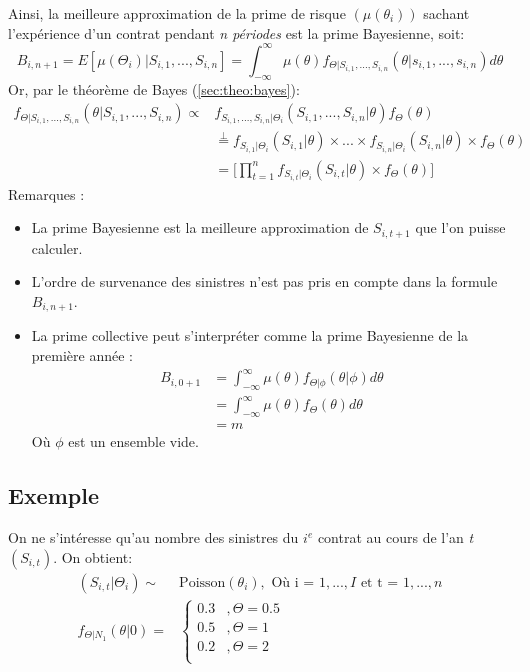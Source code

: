 \documentclass[11pt,french]{report}
\begin{document}
Ainsi, la meilleure approximation de la prime de risque $(\mu(\theta_i))$ sachant l'expérience d'un contrat pendant \emph{n périodes} est la prime Bayesienne, soit:
\begin{equation}
\label{eq:prime bayesienne}
B_{i,n+1} = E[\mu(\Theta_i)|S_{i,1}, ..., S_{i,n}] = \int_{-\infty}^{\infty} \mu(\theta) f_{\Theta|S_{i,1}, ..., S_{i,n}}(\theta| s_{i,1}, ..., s_{i,n})d\theta
\end{equation}
Or, par le théorème de Bayes (\ref{sec:theo:bayes}):
\begin{align*}
f_{\Theta|S_{i,1}, ..., S_{i,n}}(\theta|S_{i,1}, ..., S_{i,n}) \propto & f_{S_{i,1}, ..., S_{i,n}|\Theta_i}(S_{i,1}, ..., S_{i,n}|\theta) f_{\Theta}(\theta)\\
& \overset{\perp}{=} f_{S_{i,1}|\Theta_i}(S_{i,1}|\theta)\times ...\times  f_{S_{i,n}|\Theta_i}(S_{i,n}|\theta) \times  f_{\Theta}(\theta)\\
& = \Bigg[ \prod_{t =1}^{n} f_{S_{i,t}|\Theta_i}(S_{i,t}|\theta)\times  f_{\Theta}(\theta) \Bigg]
\end{align*}
Remarques :
\begin{itemize}
\item La prime Bayesienne est la meilleure approximation de $S_{i,t+1}$ que l'on puisse calculer.
\item L'ordre de survenance des sinistres n'est pas pris en compte dans la formule $B_{i,n+1}$.
\item La prime collective peut s'interpréter comme la prime Bayesienne de la première année :
	\begin{align*}
	B_{i,0+1} &=  \int_{-\infty}^{\infty} \mu(\theta) f_{\Theta|\phi}(\theta| \phi)d\theta \\
	&= \int_{-\infty}^{\infty} \mu(\theta) f_{\Theta}(\theta)d\theta \\
	&= m
	\end{align*}
	Où $\phi$ est un ensemble vide.
\end{itemize}
\subsection*{Exemple}
On ne s'intéresse qu'au nombre des sinistres du $i^{e}$ contrat au cours de l'an \emph{t} $(S_{i,t})$.
On obtient:
\begin{align*}
(S_{i,t}|\Theta_i) \sim &\text{Poisson}(\theta_i),  \text{ Où i = }1, ..., I \text{ et } \text{t = } 1,...,n \\
f_{\Theta|N_1}(\theta|0) = & \left\{
     \begin{array}{rl}
      0.3 &, \Theta = 0.5 \\
      0.5 &, \Theta = 1 \\
      0.2 &, \Theta = 2 \\
     \end{array}
     \right. \\
\end{align*}
\end{document}

